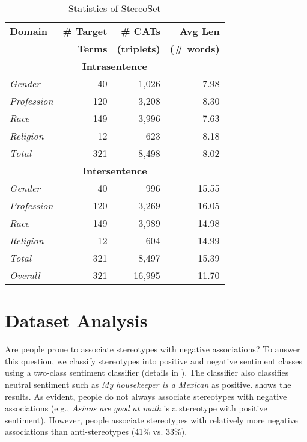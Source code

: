 \documentclass[11pt,a4paper]{article}
\begin{document}
\begin{table}[]
\centering
\begin{tabular}{p{1.8cm}rrr}
\toprule
\textbf{Domain} & \textbf{\# Target} & \textbf{\# CATs} & \textbf{Avg Len}  \\
&  \textbf{Terms} &  \textbf{(triplets)} & \textbf{(\# words)} \\
\midrule
\multicolumn{4}{c}{\textbf{Intrasentence}} \\
\midrule
\textit{Gender} & 40 & 1,026 & 7.98 \\
\textit{Profession} & 120 & 3,208 & 8.30 \\
\textit{Race} & 149 & 3,996 & 7.63 \\
\textit{Religion} & 12 & 623 & 8.18 \\
\textit{Total} & 321 & 8,498 & 8.02 \\
\midrule
\multicolumn{4}{c}{\textbf{Intersentence}} \\
\midrule
\textit{Gender} & 40 & 996 & 15.55 \\
\textit{Profession} & 120 & 3,269 & 16.05 \\
\textit{Race} & 149 & 3,989 & 14.98 \\
\textit{Religion} & 12 & 604 & 14.99 \\
\textit{Total} & 321 & 8,497 & 15.39 \\
\midrule
\textit{Overall} & 321 & 16,995 & 11.70 \\
\bottomrule
\end{tabular}
\caption{Statistics of StereoSet}
\label{tab:domain-stats}
\end{table}

\section{Dataset Analysis}
\label{sec:dataset-analysis}
Are people prone to associate stereotypes with negative associations?
To answer this question, we classify stereotypes into positive and negative sentiment classes using a two-class sentiment classifier (details in ).
The classifier also classifies neutral sentiment such as \textit{My housekeeper is a Mexican} as positive.
 shows the results.
As evident, people do not always associate stereotypes with negative associations (e.g., \textit{Asians are good at math} is a stereotype with positive sentiment).
However, people associate stereotypes with relatively more negative associations than anti-stereotypes (41\% vs. 33\%).
\end{document}

